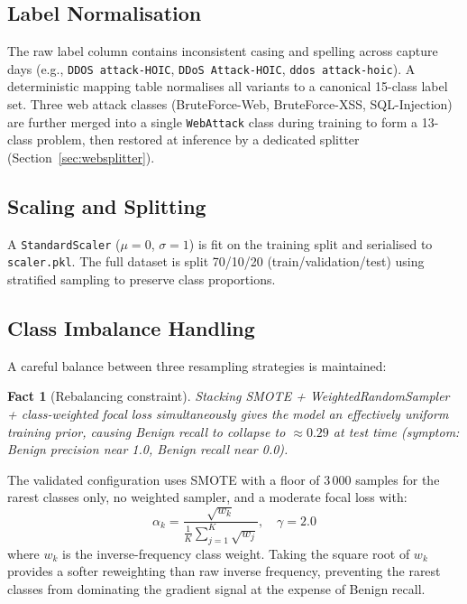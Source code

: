 \documentclass[12pt]{article}
\theoremstyle{plain}
\newtheorem{lemma}{Fact}[section]
\begin{document}
\subsection{Label Normalisation}

The raw label column contains inconsistent casing and spelling across capture days (e.g., \texttt{DDOS attack-HOIC}, \texttt{DDoS Attack-HOIC}, \texttt{ddos attack-hoic}). A deterministic mapping table normalises all variants to a canonical 15-class label set. Three web attack classes (BruteForce-Web, BruteForce-XSS, SQL-Injection) are further merged into a single \texttt{WebAttack} class during training to form a 13-class problem, then restored at inference by a dedicated splitter (Section~\ref{sec:websplitter}).

\subsection{Scaling and Splitting}

A \texttt{StandardScaler} ($\mu=0$, $\sigma=1$) is fit on the training split and serialised to \texttt{scaler.pkl}. The full dataset is split 70/10/20 (train/validation/test) using stratified sampling to preserve class proportions.

\subsection{Class Imbalance Handling}

A careful balance between three resampling strategies is maintained:

\begin{lemma}[Rebalancing constraint]
Stacking SMOTE + WeightedRandomSampler + class-weighted focal loss simultaneously gives the model an effectively uniform training prior, causing Benign recall to collapse to $\approx 0.29$ at test time (symptom: Benign precision near 1.0, Benign recall near 0.0).
\end{lemma}

The validated configuration uses SMOTE with a floor of 3\,000 samples for the rarest classes only, no weighted sampler, and a moderate focal loss with:
\begin{equation}
\alpha_k = \frac{\sqrt{w_k}}{\frac{1}{K}\sum_{j=1}^{K}\sqrt{w_j}}, \quad \gamma = 2.0
\end{equation}
where $w_k$ is the inverse-frequency class weight. Taking the square root of $w_k$ provides a softer reweighting than raw inverse frequency, preventing the rarest classes from dominating the gradient signal at the expense of Benign recall.
\end{document}
